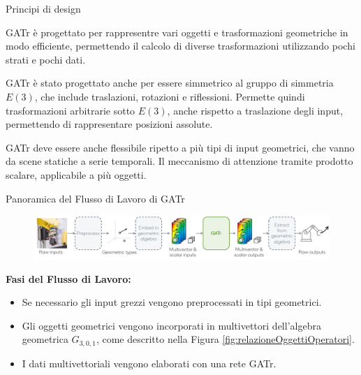 \begin{frame}{Principi di design}

    GATr è progettato per rappresentre vari oggetti e trasformazioni geometriche in 
    modo efficiente, permettendo il calcolo di diverse trasformazioni utilizzando pochi 
    strati e pochi dati. 

    GATr è stato progettato anche per essere simmetrico al gruppo di simmetria \(E(3)\),
    che include traslazioni, rotazioni e riflessioni. Permette quindi trasformazioni 
    arbitrarie sotto \(E(3)\), anche rispetto a traslazione degli input, permettendo di 
    rappresentare posizioni assolute. 

    GATr deve essere anche flessibile ripetto a più tipi di input geometrici, che vanno 
    da scene statiche a serie temporali. Il meccanismo di attenzione tramite prodotto 
    scalare, applicabile a più oggetti.

\end{frame}
\begin{frame}{Panoramica del Flusso di Lavoro di GATr}
    \begin{figure}
        \centering
        \includegraphics[width=1\textwidth]{../Images/GatrWorkflow.png}
    \end{figure}
    
    \textbf{Fasi del Flusso di Lavoro:}
    \begin{itemize}
        \item Se necessario gli input grezzi vengono preprocessati in tipi geometrici.
        \item Gli oggetti geometrici vengono incorporati in multivettori dell'algebra 
        geometrica \( G_{3,0,1} \), come descritto nella Figura \ref{fig:relazioneOggettiOperatori}.
        \item I dati multivettoriali vengono elaborati con una rete GATr.
    \end{itemize}
\end{frame}

